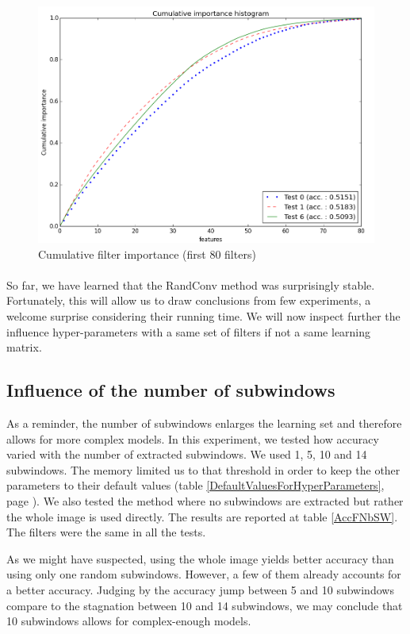 \documentclass[a4paper]{report}
\newlength{\larg}
\begin{document}
		\begin{figure}
			\centering
				\includegraphics[width=1.0\textwidth]{images/FIGVarCumHist.png}
			\caption{\label{fig:FIGVarCumHist}Cumulative filter importance (first 80 filters)}
		\end{figure}
		
		\paragraph{}
		So far, we have learned that the RandConv method was surprisingly stable. Fortunately, this will allow us to draw conclusions from few experiments, a welcome surprise considering their running time. We will now inspect further the influence hyper-parameters with a same set of filters if not a same learning matrix.
		
		\subsection{Influence of the number of subwindows}
		As a reminder, the number of subwindows enlarges the learning set and therefore allows for more complex models. In this experiment, we tested how accuracy varied with the number of extracted subwindows. We used 1, 5, 10 and 14 subwindows. The memory limited us to that threshold in order to keep the other parameters to their default values (table \ref{DefaultValuesForHyperParameters}, page \pageref{DefaultValuesForHyperParameters}). We also tested the method where no subwindows are extracted but rather the whole image is used directly. The results are reported at table \ref{AccFNbSW}. The filters were the same in all the tests.
		\par
		As we might have suspected, using the whole image yields better accuracy than using only one random subwindows. However, a few of them already accounts for a better accuracy. Judging by the accuracy jump between 5 and 10 subwindows compare to the stagnation between 10 and 14 subwindows, we may conclude that 10 subwindows allows for complex-enough models. 
		
\end{document}

